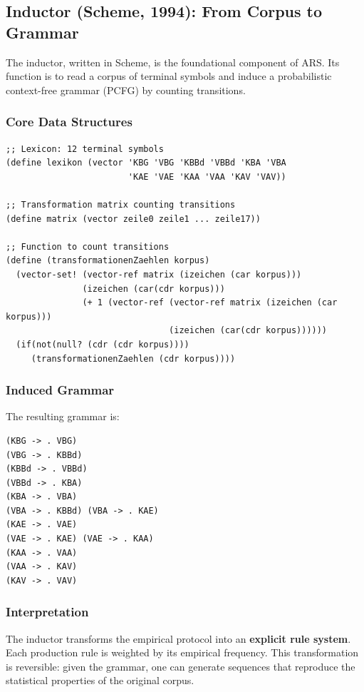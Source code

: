\documentclass[12pt,a4paper]{article}
\begin{document}
\subsection{Inductor (Scheme, 1994): From Corpus to Grammar}

The inductor, written in Scheme, is the foundational component of ARS. Its 
function is to read a corpus of terminal symbols and induce a probabilistic 
context-free grammar (PCFG) by counting transitions.

\subsubsection{Core Data Structures}

\begin{lstlisting}[caption=Lexicon and Transformation Matrix in Scheme]
;; Lexicon: 12 terminal symbols
(define lexikon (vector 'KBG 'VBG 'KBBd 'VBBd 'KBA 'VBA 
                        'KAE 'VAE 'KAA 'VAA 'KAV 'VAV))

;; Transformation matrix counting transitions
(define matrix (vector zeile0 zeile1 ... zeile17))

;; Function to count transitions
(define (transformationenZaehlen korpus)
  (vector-set! (vector-ref matrix (izeichen (car korpus))) 
               (izeichen (car(cdr korpus))) 
               (+ 1 (vector-ref (vector-ref matrix (izeichen (car korpus))) 
                                (izeichen (car(cdr korpus))))))
  (if(not(null? (cdr (cdr korpus))))
     (transformationenZaehlen (cdr korpus))))
\end{lstlisting}

\subsubsection{Induced Grammar}

The resulting grammar is:

\begin{verbatim}
(KBG -> . VBG)
(VBG -> . KBBd)
(KBBd -> . VBBd)
(VBBd -> . KBA)
(KBA -> . VBA)
(VBA -> . KBBd) (VBA -> . KAE)
(KAE -> . VAE)
(VAE -> . KAE) (VAE -> . KAA)
(KAA -> . VAA)
(VAA -> . KAV)
(KAV -> . VAV)
\end{verbatim}

\subsubsection{Interpretation}

The inductor transforms the empirical protocol into an \textbf{explicit rule 
system}. Each production rule is weighted by its empirical frequency. This 
transformation is reversible: given the grammar, one can generate sequences 
that reproduce the statistical properties of the original corpus.
\end{document}
